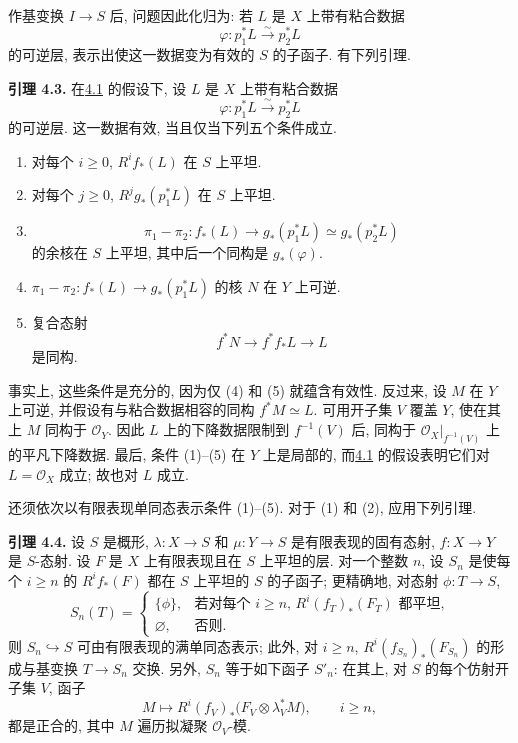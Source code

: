 作基变换 \(I\to S\) 后, 问题因此化归为: 若 \(L\) 是 \(X\) 上带有粘合数据
\[
  \varphi:p_1^*L\xrightarrow{\sim}p_2^*L
\]
的可逆层, 表示出使这一数据变为有效的 \(S\) 的子函子. 有下列引理.

\textbf{引理 4.3.} 在\hyperlink{sga6.e12.prop.4-1}{4.1} 的假设下, 设 \(L\) 是 \(X\) 上带有粘合数据
\[
  \varphi:p_1^*L\xrightarrow{\sim}p_2^*L
\]
的可逆层. 这一数据有效, 当且仅当下列五个条件成立.
\begin{enumerate}[label=\arabic*)]
\item 对每个 \(i\geq0\), \(R^if_*(L)\) 在 \(S\) 上平坦.
\item 对每个 \(j\geq0\), \(R^jg_*(p_1^*L)\) 在 \(S\) 上平坦.
\item
\[
  \pi_1-\pi_2:f_*(L)\longrightarrow
  g_*(p_1^*L)\simeq g_*(p_2^*L)
\]
的余核在 \(S\) 上平坦, 其中后一个同构是 \(g_*(\varphi)\).
\item \(\pi_1-\pi_2:f_*(L)\to g_*(p_1^*L)\) 的核 \(N\) 在 \(Y\) 上可逆.
\item 复合态射
\[
  f^*N\longrightarrow f^*f_*L\longrightarrow L
\]
是同构.
\end{enumerate}

事实上, 这些条件是充分的, 因为仅 (4) 和 (5) 就蕴含有效性. 反过来, 设 \(M\) 在 \(Y\) 上可逆, 并假设有与粘合数据相容的同构 \(f^*M\simeq L\). 可用开子集 \(V\) 覆盖 \(Y\), 使在其上 \(M\) 同构于 \(\mathcal O_Y\). 因此 \(L\) 上的下降数据限制到 \(f^{-1}(V)\) 后, 同构于 \(\mathcal O_X|_{f^{-1}(V)}\) 上的平凡下降数据. 最后, 条件 (1)--(5) 在 \(Y\) 上是局部的, 而\hyperlink{sga6.e12.prop.4-1}{4.1} 的假设表明它们对 \(L=\mathcal O_X\) 成立; 故也对 \(L\) 成立.

还须依次以有限表现单同态表示条件 (1)--(5). 对于 (1) 和 (2), 应用下列引理.

\textbf{引理 4.4.} 设 \(S\) 是概形, \(\lambda:X\to S\) 和 \(\mu:Y\to S\) 是有限表现的固有态射, \(f:X\to Y\) 是 \(S\)-态射. 设 \(F\) 是 \(X\) 上有限表现且在 \(S\) 上平坦的层. 对一个整数 \(n\), 设 \(S_n\) 是使每个 \(i\geq n\) 的 \(R^if_*(F)\) 都在 \(S\) 上平坦的 \(S\) 的子函子; 更精确地, 对态射 \(\phi:T\to S\),
\[
  S_n(T)=
  \begin{cases}
    \{\phi\},&\text{若对每个 \(i\geq n\), \(R^i(f_T)_*(F_T)\) 都平坦,}\\
    \varnothing,&\text{否则.}
  \end{cases}
\]
则 \(S_n\hookrightarrow S\) 可由有限表现的满单同态表示; 此外, 对 \(i\geq n\), \(R^i(f_{S_n})_*(F_{S_n})\) 的形成与基变换 \(T\to S_n\) 交换. 另外, \(S_n\) 等于如下函子 \(S'_n\): 在其上, 对 \(S\) 的每个仿射开子集 \(V\), 函子
\[
  M\longmapsto
  R^i(f_V)_*\bigl(F_V\otimes\lambda_V^*M\bigr),
  \qquad i\geq n,
\]
都是正合的, 其中 \(M\) 遍历拟凝聚 \(\mathcal O_V\)-模.

